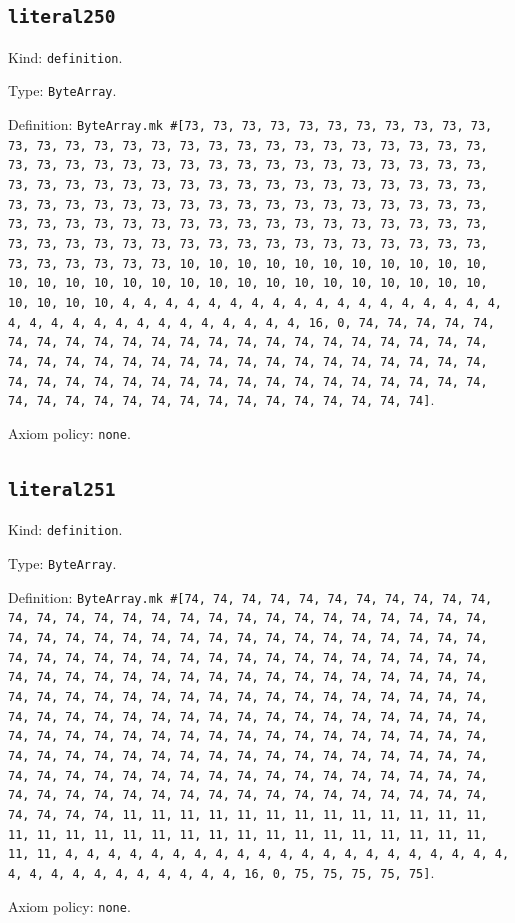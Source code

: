 \documentclass[11pt]{article}
\begin{document}
\subsection*{\texttt{literal250}}
\noindent Kind: \texttt{definition}.\par
\noindent Type: \texttt{ByteArray}.\par
\noindent Definition: \texttt{ByteArray.mk \#[73, 73, 73, 73, 73, 73, 73, 73, 73, 73, 73, 73, 73, 73, 73, 73, 73, 73, 73, 73, 73, 73, 73, 73, 73, 73, 73, 73, 73, 73, 73, 73, 73, 73, 73, 73, 73, 73, 73, 73, 73, 73, 73, 73, 73, 73, 73, 73, 73, 73, 73, 73, 73, 73, 73, 73, 73, 73, 73, 73, 73, 73, 73, 73, 73, 73, 73, 73, 73, 73, 73, 73, 73, 73, 73, 73, 73, 73, 73, 73, 73, 73, 73, 73, 73, 73, 73, 73, 73, 73, 73, 73, 73, 73, 73, 73, 73, 73, 73, 73, 73, 73, 73, 73, 73, 73, 73, 73, 73, 73, 73, 73, 73, 73, 73, 73, 73, 73, 73, 10, 10, 10, 10, 10, 10, 10, 10, 10, 10, 10, 10, 10, 10, 10, 10, 10, 10, 10, 10, 10, 10, 10, 10, 10, 10, 10, 10, 10, 10, 10, 10, 4, 4, 4, 4, 4, 4, 4, 4, 4, 4, 4, 4, 4, 4, 4, 4, 4, 4, 4, 4, 4, 4, 4, 4, 4, 4, 4, 4, 4, 4, 4, 4, 16, 0, 74, 74, 74, 74, 74, 74, 74, 74, 74, 74, 74, 74, 74, 74, 74, 74, 74, 74, 74, 74, 74, 74, 74, 74, 74, 74, 74, 74, 74, 74, 74, 74, 74, 74, 74, 74, 74, 74, 74, 74, 74, 74, 74, 74, 74, 74, 74, 74, 74, 74, 74, 74, 74, 74, 74, 74, 74, 74, 74, 74, 74, 74, 74, 74, 74, 74, 74, 74, 74, 74, 74]}.\par
\noindent Axiom policy: \texttt{none}.\par
\subsection*{\texttt{literal251}}
\noindent Kind: \texttt{definition}.\par
\noindent Type: \texttt{ByteArray}.\par
\noindent Definition: \texttt{ByteArray.mk \#[74, 74, 74, 74, 74, 74, 74, 74, 74, 74, 74, 74, 74, 74, 74, 74, 74, 74, 74, 74, 74, 74, 74, 74, 74, 74, 74, 74, 74, 74, 74, 74, 74, 74, 74, 74, 74, 74, 74, 74, 74, 74, 74, 74, 74, 74, 74, 74, 74, 74, 74, 74, 74, 74, 74, 74, 74, 74, 74, 74, 74, 74, 74, 74, 74, 74, 74, 74, 74, 74, 74, 74, 74, 74, 74, 74, 74, 74, 74, 74, 74, 74, 74, 74, 74, 74, 74, 74, 74, 74, 74, 74, 74, 74, 74, 74, 74, 74, 74, 74, 74, 74, 74, 74, 74, 74, 74, 74, 74, 74, 74, 74, 74, 74, 74, 74, 74, 74, 74, 74, 74, 74, 74, 74, 74, 74, 74, 74, 74, 74, 74, 74, 74, 74, 74, 74, 74, 74, 74, 74, 74, 74, 74, 74, 74, 74, 74, 74, 74, 74, 74, 74, 74, 74, 74, 74, 74, 74, 74, 74, 74, 74, 74, 74, 74, 74, 74, 74, 74, 74, 74, 74, 74, 74, 74, 74, 74, 74, 74, 74, 74, 74, 74, 74, 74, 11, 11, 11, 11, 11, 11, 11, 11, 11, 11, 11, 11, 11, 11, 11, 11, 11, 11, 11, 11, 11, 11, 11, 11, 11, 11, 11, 11, 11, 11, 11, 11, 4, 4, 4, 4, 4, 4, 4, 4, 4, 4, 4, 4, 4, 4, 4, 4, 4, 4, 4, 4, 4, 4, 4, 4, 4, 4, 4, 4, 4, 4, 4, 4, 16, 0, 75, 75, 75, 75, 75]}.\par
\noindent Axiom policy: \texttt{none}.\par
\end{document}
